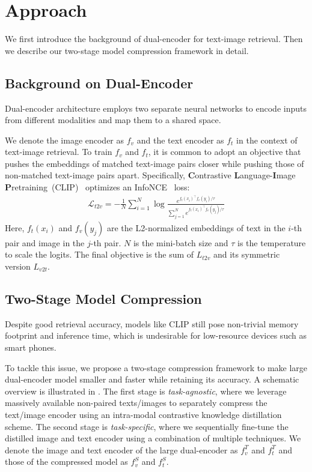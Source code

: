 \section{Approach}

We first introduce the background of dual-encoder for text-image retrieval. Then we describe our two-stage model compression framework in detail.


\subsection{Background on Dual-Encoder}
\label{pre}
Dual-encoder architecture employs two separate neural networks to encode inputs from different modalities and map them to a shared  space. 

We denote the image encoder as $f_v$ and the text encoder as $f_t$ in the context of text-image retrieval. To train $f_v$ and $f_t$, it is common to adopt an objective that pushes the embeddings of matched text-image pairs closer while pushing those of non-matched text-image pairs apart. Specifically, \textbf{C}ontrastive \textbf{L}anguage-\textbf{I}mage \textbf{P}retraining~(CLIP)~\cite{clip} optimizes an InfoNCE~\cite{infonce} loss:
\begin{align}
	\mathcal{L}_{t2v}=-\frac{1}{N}\sum_{i=1}^{N}\log{\frac{e^{f_t(x_i)^\top f_v(y_i)/\tau}}{\sum_{j=1}^{N}e^{f_t(x_i)^\top f_v(y_j)/\tau}}}
	\label{infonce}
\end{align}
Here, $f_t(x_i)$ and $f_v(y_j)$ are the L2-normalized embeddings of text in the $i$-th pair and image in the $j$-th pair. $N$ is the mini-batch size and $\tau$ is the temperature to scale the logits. The final objective is the sum of $L_{t2v}$ and its symmetric version $L_{v2t}$.

\subsection{Two-Stage Model Compression}
\label{sec2}
Despite good retrieval accuracy, models like CLIP still pose non-trivial memory 
footprint and inference time, which is undesirable for low-resource devices 
such as smart phones. 

To tackle this issue, we propose a two-stage compression framework to make large dual-encoder model smaller and faster while retaining its accuracy. A schematic overview is illustrated in . The first stage is \textit{task-agnostic}, where we leverage massively available non-paired texts/images to separately compress the text/image encoder using an intra-modal contrastive knowledge distillation scheme. The second stage is \textit{task-specific}, where we sequentially fine-tune the distilled image and text encoder using a combination of multiple techniques. We denote the image and text encoder of the large dual-encoder as $f_v^{T}$ and $f_t^{T}$ and those of the compressed model as $f_v^{S}$ and $f_t^{S}$.

